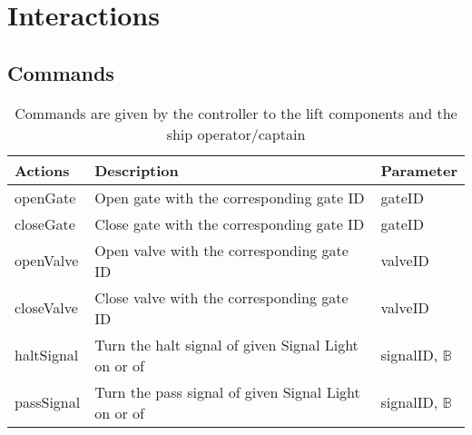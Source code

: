 \section{Interactions}
\subsection{Commands}
\begin{table}[htbp]
	\centering
	\caption{Commands are given by the controller to the lift components and the ship operator/captain}
	\begin{tabular}{lll}
		\toprule
		\textbf{Actions} & \textbf{Description} & \textbf{Parameter} \\
		\midrule
		openGate & Open gate with the corresponding gate ID & gateID \\
		closeGate & Close gate with the corresponding gate ID & gateID \\
		openValve & Open valve with the corresponding gate ID & valveID \\
		closeValve & Close valve with the corresponding gate ID & valveID \\
		haltSignal & Turn the halt signal of given Signal Light on or of & signalID, $\mathbb{B}$\\
		passSignal & Turn the pass signal of given Signal Light on or of & signalID, $\mathbb{B}$\\

\bottomrule
\end{tabular}%
\label{tab:addlabel}%
\end{table}%
		
		
		


		
